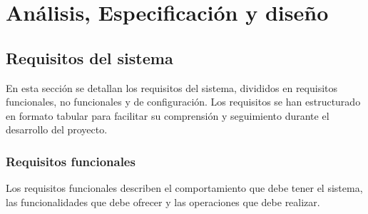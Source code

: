 
\chapter{Análisis, Especificación y diseño}
\label{analisis}

\section{Requisitos del sistema}
En esta sección se detallan los requisitos del sistema, divididos en requisitos funcionales, no funcionales y de configuración. Los requisitos se han estructurado en formato tabular para facilitar su comprensión y seguimiento durante el desarrollo del proyecto.

\subsection{Requisitos funcionales}
Los requisitos funcionales describen el comportamiento que debe tener el sistema, las funcionalidades que debe ofrecer y las operaciones que debe realizar.

